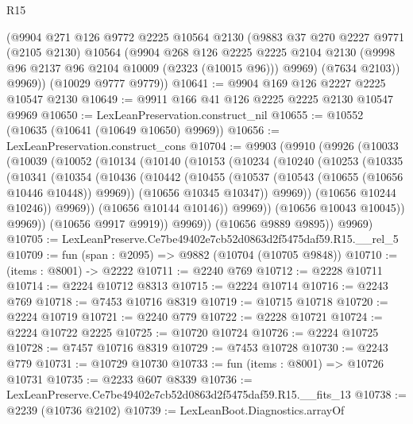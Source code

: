 \begin{lexlean}{R15}
\begin{coremodule}
        (@9904
          @271
          @126
          @9772
          @2225
          @10564
          @2130
          (@9883
            @37
            @270
            @2227
            @9771
            (@2105 @2130)
            @10564
            (@9904
              @268
              @126
              @2225
              @2225
              @2104
              @2130
              (@9998 @96 @2137 @96 @2104 @10009 (@2323 (@10015 @96)))
              @9969)
            (@7634 @2103))
          @9969))
      (@10029 @9777 @9779))
@10641 := @9904 @169 @126 @2227 @2225 @10547 @2130
@10649 := @9911 @166 @41 @126 @2225 @2225 @2130 @10547 @9969
@10650 := LexLeanPreservation.construct_nil
@10655 := @10552 (@10635 (@10641 (@10649 @10650) @9969))
@10656 := LexLeanPreservation.construct_cons
@10704 := @9903
    (@9910
      (@9926
        (@10033
          (@10039
            (@10052
              (@10134
                (@10140
                  (@10153
                    (@10234
                      (@10240
                        (@10253
                          (@10335
                            (@10341
                              (@10354
                                (@10436
                                  (@10442
                                    (@10455
                                      (@10537 (@10543 (@10655 (@10656 @10446 @10448)) @9969))
                                      (@10656 @10345 @10347))
                                    @9969))
                                (@10656 @10244 @10246))
                              @9969))
                          (@10656 @10144 @10146))
                        @9969))
                    (@10656 @10043 @10045))
                  @9969))
              (@10656 @9917 @9919))
            @9969))
        (@10656 @9889 @9895))
      @9969)
@10705 := LexLeanPreserve.Ce7be49402e7cb52d0863d2f5475daf59.R15.__rel_5
@10709 := fun (span : @2095) => @9882 (@10704 (@10705 @9848))
@10710 := (items : @8001) -> @2222
@10711 := @2240 @769
@10712 := @2228 @10711
@10714 := @2224 @10712 @8313
@10715 := @2224 @10714
@10716 := @2243 @769
@10718 := @7453 @10716 @8319
@10719 := @10715 @10718
@10720 := @2224 @10719
@10721 := @2240 @779
@10722 := @2228 @10721
@10724 := @2224 @10722 @2225
@10725 := @10720 @10724
@10726 := @2224 @10725
@10728 := @7457 @10716 @8319
@10729 := @7453 @10728
@10730 := @2243 @779
@10731 := @10729 @10730
@10733 := fun (items : @8001) => @10726 @10731
@10735 := @2233 @607 @8339
@10736 := LexLeanPreserve.Ce7be49402e7cb52d0863d2f5475daf59.R15.__fits_13
@10738 := @2239 (@10736 @2102)
@10739 := LexLeanBoot.Diagnostics.arrayOf

\end{coremodule}
\end{lexlean}
